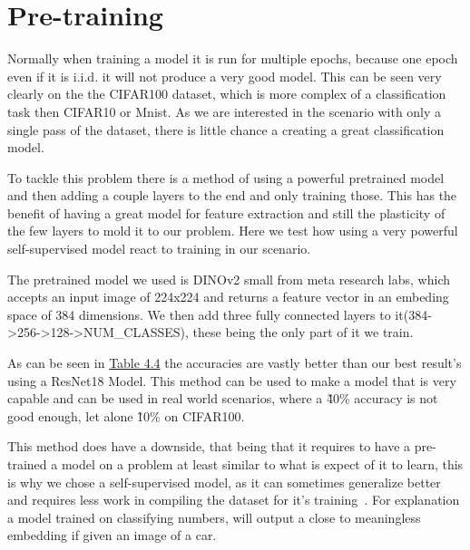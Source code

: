 \documentclass[oneside]{ctuthesis}
\begin{document}
\section{Pre-training}
\label{sec:expthree}
Normally when training a model it is run for multiple epochs, because one epoch even if it is i.i.d. it will not produce a very good model. This can be seen very clearly on the the CIFAR100 dataset, which is more complex of a classification task then CIFAR10 or Mnist. As we are interested in the scenario with only a single pass of the dataset, there is little chance a creating a great classification model.

To tackle this problem there is a method of using a powerful pretrained model and then adding a couple layers to the end and only training those. This has the benefit of having a great model for feature extraction and still the plasticity of the few layers to mold it to our problem. Here we test how using a very powerful self-supervised model react to training in our scenario.

The pretrained model we used is DINOv2 small from meta research labs, which accepts an input image of 224x224 and returns a feature vector in an embeding space of 384 dimensions. We then add three fully connected layers to it(384->256->128->NUM\_CLASSES), these being the only part of it we train.

As can be seen in \hyperref[tab:pre-training-comparison]{Table 4.4} the accuracies are vastly better than our best result's using a ResNet18 Model. This method can be used to make a model that is very capable and can be used in real world scenarios, where a \~40\% accuracy is not good enough, let alone \~10\% on CIFAR100.

This method does have a downside, that being that it requires to have a pre-trained a model on a problem at least similar to what is expect of it to learn, this is why we chose a self-supervised model, as it can sometimes generalize better and requires less work in compiling the dataset for it's training~\cite{self-supervized-generalization}. For explanation a model trained on classifying numbers, will output a close to meaningless embedding if given an image of a car.
\end{document}
